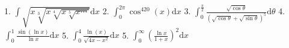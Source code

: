 \documentclass{article}
\newcommand{\dd}{\mathrm{d}}
\begin{document}
\begin{flushleft}
1. $\int \sqrt{x\sqrt[3]{x\sqrt[4]{x\sqrt[5]{x\cdots}}}} \dd x$ \newline  \newline \newline 
2. $\int_0^{2\pi} \cos^{420}(x) \dd x$ \newline  \newline \newline 
3. $\int_0^{\frac{\pi}{2}} \frac{\sqrt{\cos{\theta}}}{(\sqrt{\cos{\theta}}+\sqrt{\sin{\theta}})^5} \dd \theta$  \newline  \newline \newline 
4. $\int_0^1 \frac{\sin(\ln{x})}{\ln{x}} \dd x$ \newline  \newline \newline 
5. $\int_0^4 \frac{\ln(x)}{\sqrt{4x-x^2}} \dd x$ \newline  \newline \newline 
5. $\int_0^{\infty} \left(\frac{\ln{x}}{1+x}\right)^2 \dd x$ \newline  \newline \newline 

\end{flushleft}
\end{document}
